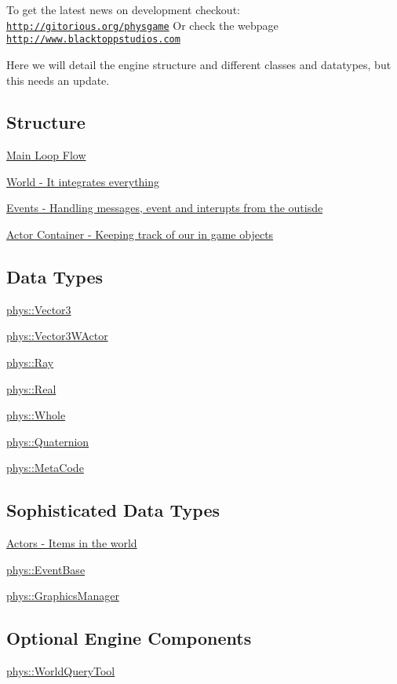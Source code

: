 To get the latest news on development checkout: \href{http://gitorious.org/physgame}{\tt http://gitorious.org/physgame} Or check the webpage \href{http://www.blacktoppstudios.com}{\tt http://www.blacktoppstudios.com}

Here we will detail the engine structure and different classes and datatypes, but this needs an update.\hypertarget{index_Engine}{}\subsection{Structure}\label{index_Engine}
\hyperlink{mainloop1}{Main Loop Flow}

\hyperlink{classphys_1_1World}{World -\/ It integrates everything}

\hyperlink{classphys_1_1EventManager}{Events -\/ Handling messages, event and interupts from the outisde}

\hyperlink{actorcontainer1}{Actor Container -\/ Keeping track of our in game objects}\hypertarget{index_Types}{}\subsection{Data Types}\label{index_Types}
\hyperlink{classphys_1_1Vector3}{phys::Vector3}

\hyperlink{classphys_1_1Vector3WActor}{phys::Vector3WActor}

\hyperlink{classphys_1_1Ray}{phys::Ray}

\hyperlink{namespacephys_af7eb897198d265b8e868f45240230d5f}{phys::Real}

\hyperlink{namespacephys_a460f6bc24c8dd347b05e0366ae34f34a}{phys::Whole}

\hyperlink{classphys_1_1Quaternion}{phys::Quaternion}

\hyperlink{classphys_1_1MetaCode}{phys::MetaCode}\hypertarget{index_Classes}{}\subsection{Sophisticated Data Types}\label{index_Classes}
\hyperlink{classphys_1_1ActorBase}{Actors -\/ Items in the world}

\hyperlink{classphys_1_1EventBase}{phys::EventBase}

\hyperlink{classphys_1_1GraphicsManager}{phys::GraphicsManager}\hypertarget{index_Optional}{}\subsection{Optional Engine Components}\label{index_Optional}
\hyperlink{classphys_1_1WorldQueryTool}{phys::WorldQueryTool} 